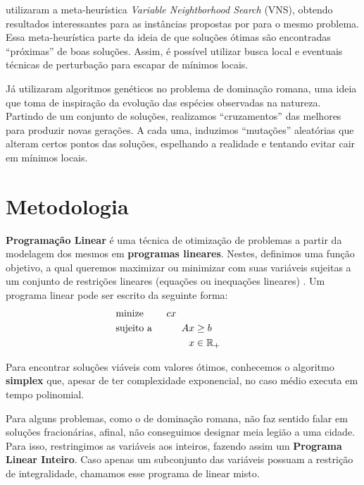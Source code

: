 \documentclass[11pt]{article}
\begin{document}
\textcite{Ivanovic2016Improvedmixedinteger} utilizaram a meta-heurística \emph{Variable Neightborhood Search} (VNS), obtendo resultados interessantes para as instâncias propostas por \textcite{Curro2014RomanDominationProblem} para o mesmo problema.
Essa meta-heurística parte da ideia de que soluções ótimas são encontradas ``próximas'' de boas soluções. Assim, é possível utilizar busca local e eventuais técnicas de perturbação para escapar de mínimos locais.

Já \textcite{Khandelwal2021RomanDominationGraphs} utilizaram algoritmos genéticos no problema de dominação romana, uma ideia que toma de inspiração da evolução das espécies observadas na natureza.
Partindo de um conjunto de soluções, realizamos ``cruzamentos'' das melhores para produzir novas gerações.
A cada uma, induzimos ``mutações'' aleatórias que alteram certos pontos das soluções, espelhando a realidade e tentando evitar cair em mínimos locais.

\section{Metodologia}
\label{sec:orgbe4b927}
\textbf{Programação Linear} é uma técnica de otimização de problemas a partir da modelagem dos mesmos em \textbf{programas lineares}.
Nestes, definimos uma função objetivo, a qual queremos maximizar ou minimizar com suas variáveis sujeitas a um conjunto de restrições lineares (equações ou inequações lineares) \autocite{Chvatal1983LinearProgramming} . Um programa linear pode ser escrito da seguinte forma:
\begin{alignat*}{4}
& \omit\rlap{minize \quad \quad $\displaystyle cx$} \\
& \mbox{sujeito a}&& \quad & Ax & \geq b  & \quad &  \\
&                 &&       & x               & \in \mathbb{R}_+ &      &
\end{alignat*}

Para encontrar soluções viáveis com valores ótimos, conhecemos o algoritmo \textbf{simplex} que, apesar de ter complexidade exponencial, no caso médio executa em tempo polinomial.

Para alguns problemas, como o de dominação romana, não faz sentido falar em soluções fracionárias, afinal, não conseguimos designar meia legião a uma cidade.
Para isso, restringimos as variáveis aos inteiros, fazendo assim um \textbf{Programa Linear Inteiro}. Caso apenas um subconjunto das variáveis possuam a restrição de integralidade, chamamos esse programa de linear misto.
\end{document}

